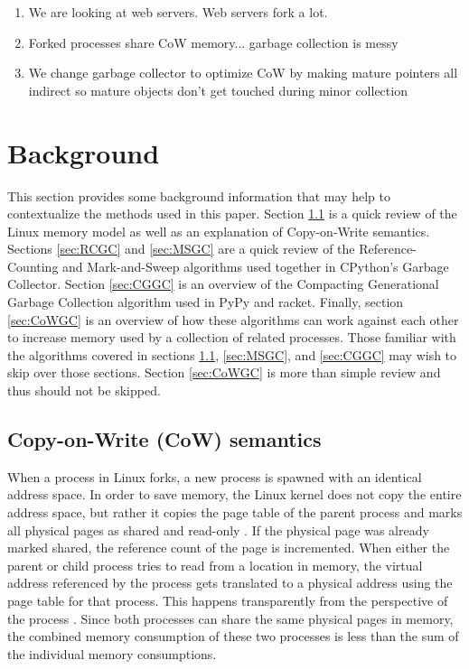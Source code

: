 \documentclass{article}
\begin{document}
  \begin{enumerate}
	\item We are looking at web servers.  Web servers fork a lot.
	\item Forked processes share CoW memory... garbage collection is messy
	\item We change garbage collector to optimize CoW by making mature pointers all indirect so mature objects don't get touched during minor collection
  \end{enumerate}

  \section{Background}

  This section provides some background information that may help to contextualize the methods used in this paper.  Section \ref{sec:CoW} is a quick review of the Linux memory model as well as an explanation of Copy-on-Write semantics.  Sections \ref{sec:RCGC} and \ref{sec:MSGC} are a quick review of the Reference-Counting and Mark-and-Sweep algorithms used together in CPython's Garbage Collector.  Section \ref{sec:CGGC} is an overview of the Compacting Generational Garbage Collection algorithm used in PyPy and racket.  Finally, section \ref{sec:CoWGC} is an overview of how these algorithms can work against each other to increase memory used by a collection of related processes.  Those familiar with the algorithms covered in sections \ref{sec:CoW}, \ref{sec:MSGC}, and \ref{sec:CGGC} may wish to skip over those sections.  Section \ref{sec:CoWGC} is more than simple review and thus should not be skipped.  

  \subsection{Copy-on-Write (CoW) semantics}\label{sec:CoW}

  When a process in Linux forks, a new process is spawned with an identical address space.  In order to save memory, the Linux kernel does not copy the entire address space, but rather it copies the page table of the parent process and marks all physical pages as shared and read-only \cite{VMM}.  If the physical page was already marked shared, the reference count of the page is incremented.  When either the parent or child process tries to read from a location in memory, the virtual address referenced by the process gets translated to a physical address using the page table for that process.  This happens transparently from the perspective of the process \cite{VMM}.  Since both processes can share the same physical pages in memory, the combined memory consumption of these two processes is less than the sum of the individual memory consumptions.
\end{document}
